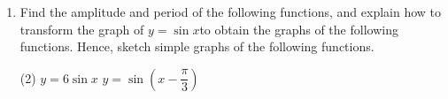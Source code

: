 \documentclass{report}
\begin{document}
        \vspace{-3em}
        \begin{enumerate}
            \item Find the amplitude and period of the following functions, and explain how to transform the graph of $y=\sin x$to obtain the graphs of the following functions. Hence, sketch simple graphs of the following functions.
            \begin{tasks}[label=(\alph*)](2)
                \task $y=6 \sin x$
                \task $y=\sin \left(x-\dfrac{\pi}{3}\right)$
            \end{tasks}
            \vspace{-1em}
            \vspace{-2em}
        \end{enumerate}
\end{document}
